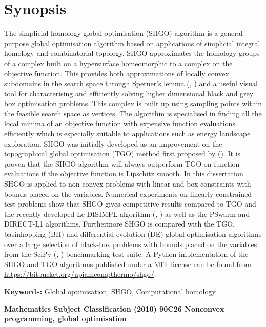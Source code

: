 \chapter*{Synopsis}
The simplicial homology global optimisation (SHGO) algorithm is a general purpose global optimisation algorithm based on applications of simplicial integral homology and combinatorial topology. SHGO approximates the homology groups of a complex built on a hypersurface homeomorphic to a complex on the objective function. This provides both approximations of locally convex subdomains in the search space through Sperner's lemma (\citeauthor{Sperner1928}, \citeyear{Sperner1928}) and a useful visual tool for characterising and efficiently solving higher dimensional black and grey box optimisation problems. This complex is built up using sampling points within the feasible search space as vertices. The algorithm is specialised in finding all the local minima of an objective function with expensive function evaluations efficiently which is especially suitable to applications such as energy landscape exploration. SHGO was initially developed as an improvement on the topographical global optimisation (TGO) method first proposed by \citeauthor{Torn1986} (\citeyear{Torn1986, Torn1990, Torn1992}). It is proven that the SHGO algorithm will always outperform TGO on function evaluations if the objective function is Lipschitz smooth. In this dissertation SHGO is applied to non-convex problems with linear and box constraints with bounds placed on the variables. Numerical experiments on linearly constrained test problems show that SHGO gives competitive results compared to TGO and the recently developed Lc-DISIMPL algorithm (\citeauthor{Paul2016}, \citeyear{Paul2016}) as well as the PSwarm and DIRECT-L1 algorithms. Furthermore SHGO is compared with the TGO, basinhopping (BH) and differential evolution (DE) global optimisation algorithms over a large selection of black-box problems with bounds placed on the variables from the SciPy (\citeauthor*{scipy}, \citeyear{scipy}) benchmarking test suite. A Python implementation of the SHGO and TGO algorithms published under a MIT license can be found from \url{https://bitbucket.org/upiamcompthermo/shgo/}.
\bigskip

\noindent \textbf{Keywords:} Global optimisation, SHGO, Computational homology
\begin{flushleft}\bf{Mathematics Subject Classification (2010)} \normalfont 90C26 Nonconvex programming, global optimisation
\end{flushleft}


